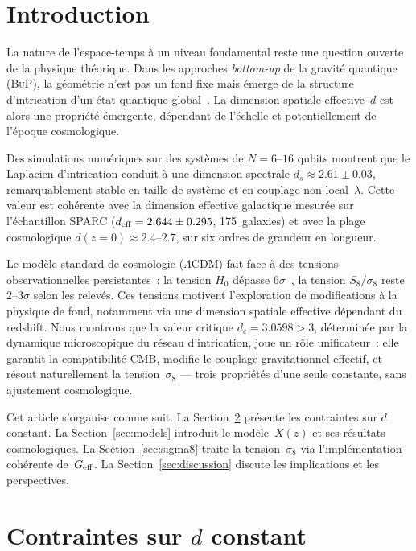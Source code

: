 \documentclass[a4paper,11pt]{article}
\newcommand{\DC}{d_c}
\newcommand{\Geff}{G_{\rm eff}}
\newcommand{\sig}{\sigma_8}
\newcommand{\LCDM}{\Lambda\mathrm{CDM}}
\newcommand{\BuP}{\textsc{BuP}}
\begin{document}
\section{Introduction}

La nature de l'espace-temps à un niveau fondamental reste une
question ouverte de la physique théorique. Dans les approches
\textit{bottom-up} de la gravité quantique (\BuP), la géométrie
n'est pas un fond fixe mais émerge de la structure d'intrication
d'un état quantique global~\cite{hamdad2026bup}. La dimension
spatiale effective~$d$ est alors une propriété émergente, dépendant
de l'échelle et potentiellement de l'époque cosmologique.

Des simulations numériques sur des systèmes de $N=6$--$16$ qubits
montrent que le Laplacien d'intrication conduit à une dimension
spectrale $d_s\approx 2.61\pm 0.03$, remarquablement stable en
taille de système et en couplage non-local~$\lambda$. Cette valeur
est cohérente avec la dimension effective galactique mesurée sur
l'échantillon SPARC ($d_{\rm eff}=2.644\pm 0.295$, 175~galaxies)
et avec la plage cosmologique $d(z=0)\approx 2.4$--$2.7$, sur
six ordres de grandeur en longueur.

Le modèle standard de cosmologie ($\LCDM$) fait face à des tensions
observationnelles persistantes~: la tension $H_0$ dépasse
$6\sigma$~\cite{tensions2025}, la tension $S_8/\sigma_8$ reste
$2$--$3\sigma$ selon les relevés. Ces tensions motivent l'exploration
de modifications à la physique de fond, notamment via une dimension
spatiale effective dépendant du redshift. Nous montrons que la valeur
critique $\DC=3.0598>3$, déterminée par la dynamique microscopique
du réseau d'intrication, joue un rôle unificateur~: elle garantit la
compatibilité CMB, modifie le couplage gravitationnel effectif, et
résout naturellement la tension~$\sig$ --- trois propriétés d'une seule
constante, sans ajustement cosmologique.

Cet article s'organise comme suit. La Section~\ref{sec:camb}
présente les contraintes sur $d$ constant. La Section~\ref{sec:models}
introduit le modèle~$X(z)$ et ses résultats cosmologiques.
La Section~\ref{sec:sigma8} traite la tension~$\sigma_8$ via
l'implémentation cohérente de~$\Geff$. La Section~\ref{sec:discussion}
discute les implications et les perspectives.

\section{Contraintes sur $d$ constant}
\label{sec:camb}
\end{document}

